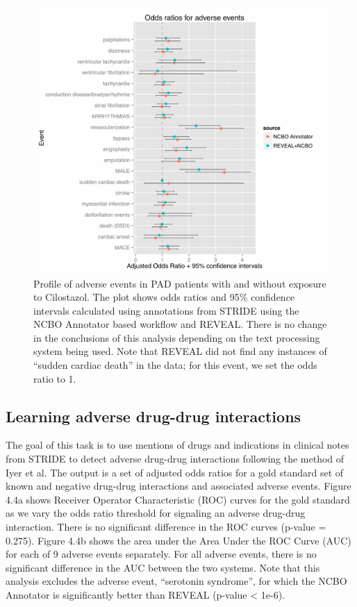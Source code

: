 \begin{figure}
  \begin{center}
    \includegraphics[width=0.9\linewidth]{ch4-figures/Figure3.pdf}
  \end{center}
  \caption[Adverse events in PAD with and without Cilostazol]{Profile
    of adverse events in PAD patients with and without exposure to
    Cilostazol.  The plot shows odds ratios and 95\% confidence
    intervals calculated using annotations from STRIDE using the NCBO
    Annotator based workflow and REVEAL.  There is no change in the
    conclusions of this analysis depending on the text processing
    system being used.  Note that REVEAL did not find any instances of
    “sudden cardiac death” in the data; for this event, we set the
    odds ratio to 1.  }
  \label{fig:short}
\end{figure}


\subsection{Learning adverse drug-drug interactions}
The goal of this task is to use mentions of drugs and indications in
clinical notes from STRIDE to detect adverse drug-drug interactions
following the method of Iyer et al.  The output is a set of adjusted
odds ratios for a gold standard set of known and negative drug-drug
interactions and associated adverse events.  Figure 4.4a shows
Receiver Operator Characteristic (ROC) curves for the gold standard as
we vary the odds ratio threshold for signaling an adverse drug-drug
interaction.  There is no significant difference in the ROC curves
(p-value = 0.275). Figure 4.4b shows the area under the Area Under the
ROC Curve (AUC) for each of 9 adverse events separately.  For all
adverse events, there is no significant difference in the AUC between
the two systems.  Note that this analysis excludes the adverse event,
“serotonin syndrome”, for which the NCBO Annotator is significantly
better than REVEAL (p-value < 1e-6).

